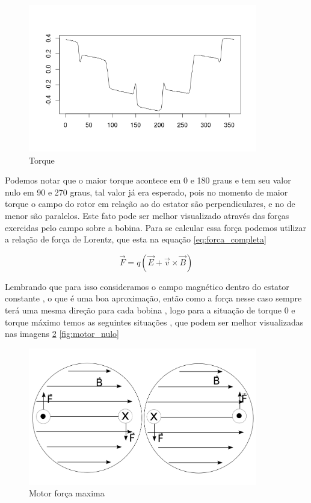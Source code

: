 \documentclass[
	12pt,				%
	openright,			%
	twoside,			%
	a4paper,			%
	english,			%
	french,				%
	spanish,			%
	brazil,				%
	]{abntex2}
\begin{document}
\begin{figure}[H]
    \centering
    \includegraphics[width=10cm]{img/torque.png}
    \caption{Torque}
    \label{fig:torque}
\end{figure}

Podemos notar que o maior torque acontece em 0 e 180 graus e tem seu valor nulo em 90 e 270 graus, tal valor já era esperado, pois no momento de maior torque o campo do rotor em relação ao do estator são perpendiculares, e no de menor são paralelos. Este fato pode ser melhor visualizado através das forças exercidas pelo campo sobre a bobina. Para se calcular essa força podemos utilizar a relação de força de Lorentz, que esta na equação \ref{eq:forca_completa}

\begin{equation} \label{eq:forca_completa}
	\vec F = q(\vec E + \vec v \times \vec B)
\end{equation} 

Lembrando que para isso consideramos o campo magnético  dentro do estator constante , o que é uma boa aproximação, então como a força nesse caso sempre terá uma mesma direção para cada bobina , logo para a situação de torque 0 e torque máximo temos as seguintes situações , que podem ser melhor visualizadas nas imagens \ref{fig:motor_max} \ref{fig:motor_nulo}

\begin{figure}[H]
    \centering
    \includegraphics[width=10cm]{img/Motor_forca_max.png}
    \caption{Motor força maxima}
    \label{fig:motor_max}
\end{figure}
\end{document}
